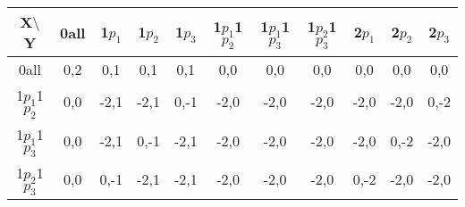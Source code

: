 \documentclass[a4paper, 11pt]{article}
\begin{document}
 \\
 \\
\begin{tabular}{c | cccccccccc}
	X$\setminus$ Y & 0all & 1$p_1$ & 1$p_2$ & 1$p_3$ & 1$p_1$1$p_2$ & 1$p_1$1$p_3$ & 1$p_2$1$p_3$ & 2$p_1$ & 2$p_2$ & 2$p_3$\\ \hline
	0all & \color{red}0,2 & 0,1 & 0,1 & 0,1 & 0,0 & 0,0 & 0,0 & 0,0 & 0,0 & 0,0\\
	1$p_1$1$p_2$ & 0,0 & \color{red}-2,1 & \color{red}-2,1 & 0,-1 & -2,0 & -2,0 & -2,0 & -2,0 & -2,0 & 0,-2\\
	1$p_1$1$p_3$ & 0,0 & \color{red}-2,1 & 0,-1 & \color{red}-2,1 & -2,0 & -2,0 & -2,0 & -2,0 & 0,-2 & -2,0\\
	1$p_2$1$p_3$ & 0,0 & 0,-1 & \color{red}-2,1 & \color{red}-2,1 & -2,0 & -2,0 & -2,0 & 0,-2 & -2,0 & -2,0\\
\end{tabular}
\end{document}
